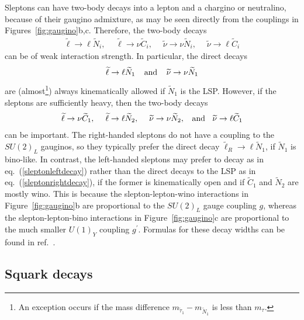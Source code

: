 \documentclass[12pt]{article}
\def\beq{\begin{eqnarray}}
\def\eeq{\end{eqnarray}}
\def\stilde{\widetilde}
\def\NI{\stilde N_1}
\begin{document}
Sleptons can have two-body decays into a lepton and a chargino or 
neutralino, because of their gaugino admixture, as may be seen directly 
from the couplings in Figures~\ref{fig:gaugino}b,c. Therefore, the 
two-body decays
\beq
\stilde \ell \rightarrow \ell \stilde N_i,\>\>\>\>\>\,
\stilde \ell \rightarrow \nu \stilde C_i,\>\>\>\>\>\,
\stilde \nu \rightarrow \nu \stilde N_i,\>\>\>\>\>\,
\stilde \nu \rightarrow \ell \stilde C_i
\eeq
can be of weak interaction strength. In particular, the direct decays
\beq
\stilde \ell \rightarrow \ell \stilde N_1
\>\>\>\>\>{\rm and}\>\>\>\>\>
\stilde \nu \rightarrow \nu \stilde N_1
\label{sleptonrightdecay}
\eeq
are (almost\footnote{An exception occurs if the mass difference $m_{\tilde
\tau_1} - m_{\tilde N_1}$ is less than $m_{\tau}$.}) always kinematically
allowed if $\stilde N_1$ is the LSP. However, if the sleptons are
sufficiently heavy, then the two-body decays
\beq
\stilde \ell \rightarrow \nu \stilde C_{1}
,\>\>\>\>\>\,
\stilde \ell \rightarrow \ell \stilde N_{2}
,\>\>\>\>\>\,
\stilde \nu \rightarrow \nu \stilde N_{2}
,\>\>\>\>{\rm and}\>\>\>\>
\stilde \nu \rightarrow \ell \stilde C_{1}
\label{sleptonleftdecay}
\eeq
can be important. The right-handed sleptons do not have a coupling to the 
$SU(2)_L$ gauginos, so they typically prefer the direct decay $\stilde 
\ell_R \rightarrow \ell\NI$, if $\NI$ is bino-like. In contrast, the 
left-handed sleptons may prefer to decay as in 
eq.~(\ref{sleptonleftdecay}) rather than the direct decays to the LSP as 
in eq.~(\ref{sleptonrightdecay}), if the former is kinematically open and 
if $\stilde C_1$ and $\stilde N_2$ are mostly wino. This is because the 
slepton-lepton-wino interactions in Figure~\ref{fig:gaugino}b are 
proportional to the $SU(2)_L$ gauge coupling $g$, whereas the 
slepton-lepton-bino interactions in Figure~\ref{fig:gaugino}c are 
proportional to the much smaller $U(1)_Y$ coupling $g^\prime$. Formulas 
for these decay widths can be found in ref.~\cite{epprod}.

\subsection{Squark decays}\label{subsec:decays.squarks}
\setcounter{equation}{0}
\setcounter{footnote}{1}
\end{document}
